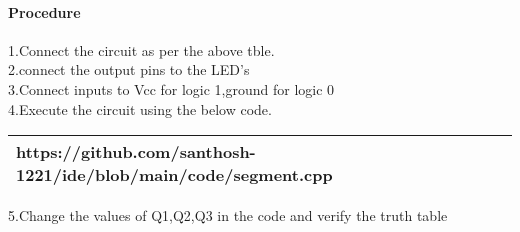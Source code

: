 \documentclass[journal,12pt,twocolumn]{IEEEtran}
\begin{document}
\paragraph{Procedure}
1.Connect the circuit as per the above tble.\\
2.connect the output pins to the LED's \\
3.Connect inputs to Vcc for logic 1,ground for logic 0 \\
4.Execute the circuit using the below code.\\
\begin{tabularx}{0.46\textwidth} {
		| >{\centering\arraybackslash}X |}
	\hline
	https://github.com/santhosh-1221/ide/blob/main/code/segment.cpp \\
	\hline
\end{tabularx}
5.Change the values of Q1,Q2,Q3 in the code and verify the truth table \\

\end{document}
